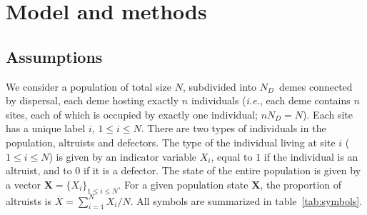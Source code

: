 \documentclass[11pt, letterpaper]{article}
\newcommand{\ie}{\textit{i.e.}}
\newcommand{\ndemes}{N_D}
\begin{document}



\section*{Model and methods}

\subsection*{Assumptions}

We consider a population of total size $N$, subdivided into $\ndemes$~demes connected by dispersal, each deme hosting exactly $n$ individuals (\ie, each deme contains $n$ sites, each of which is occupied by exactly one individual; $n \ndemes = N$). Each site has a unique label $i$, $1\leq i \leq N$. There are two types of individuals in the population, altruists and defectors. The type of the individual living at site $i$ ($1\leq i \leq N$) is given by an indicator variable $X_i$, equal to $1$ if the individual is an altruist, and to $0$ if it is a defector. The state of the entire population is given by a vector $\mathbf{X} = \{X_i\}_{1\leq i\leq N}$. For a given population state $\mathbf{X}$, the proportion of altruists is $\overline{X} = \sum_{i=1}^N X_i/N$. All symbols are summarized in table~\ref{tab:symbols}.
\end{document}
